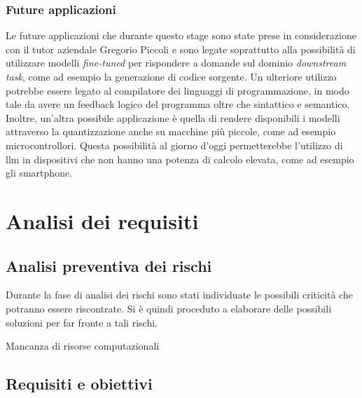     \subsubsection{Future applicazioni} 
    Le future applicazioni che durante questo stage sono state prese in considerazione con il tutor aziendale Gregorio Piccoli e sono legate soprattutto alla possibilità di utilizzare modelli 
    \textit{fine-tuned} per rispondere a domande sul dominio \textit{downstream task}, come ad esempio la generazione di codice sorgente.
    Un ulteriore utilizzo potrebbe essere legato al compilatore dei linguaggi di programmazione, in modo tale da avere un feedback logico del programma oltre che sintattico e semantico.
    Inoltre, un'altra possibile applicazione è quella di rendere disponibili i modelli attraverso la quantizzazione anche su macchine più piccole, come ad esempio microcontrollori. Questa possibilità al giorno d'oggi permetterebbe l'utilizzo 
    di \gls{llm} in dispositivi che non hanno una potenza di calcolo elevata, come ad esempio gli smartphone.

    
\section{Analisi dei requisiti}
    \subsection{Analisi preventiva dei rischi}
    Durante la fase di analisi dei rischi sono stati individuate le possibili criticità che potranno essere riscontrate.
    Si è quindi proceduto a elaborare delle possibili soluzioni per far fronte a tali rischi.
    \begin{risk}{Mancanza di risorse computazionali}
        \label{risk:data-absence} 
    \end{risk}

    \subsection{Requisiti e obiettivi}

